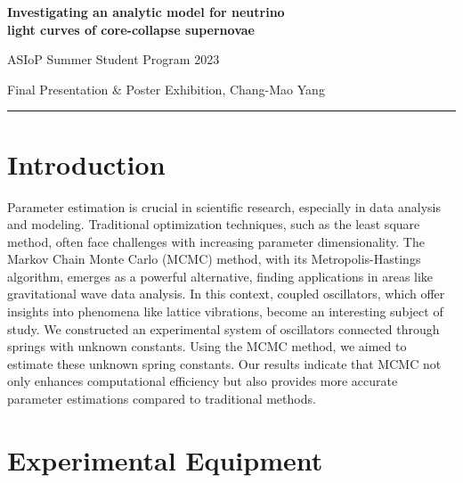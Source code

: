 \documentclass[12pt, a4paper]{article}%
\begin{document}
\begin{center}
{\Large\bf Investigating an analytic model for neutrino\\ light curves of core-collapse supernovae}

\vspace{5pt}
{\large ASIoP Summer Student Program 2023}

Final Presentation \& Poster Exhibition, Chang-Mao Yang

\vspace{5pt}
\hrule
\vspace{6pt}

\end{center}
	
\section{Introduction}

Parameter estimation is crucial in scientific research, especially in data analysis and modeling. Traditional optimization techniques, such as the least square method, often face challenges with increasing parameter dimensionality. The Markov Chain Monte Carlo (MCMC) method, with its Metropolis-Hastings algorithm, emerges as a powerful alternative, finding applications in areas like gravitational wave data analysis.
In this context, coupled oscillators, which offer insights into phenomena like lattice vibrations, become an interesting subject of study. We constructed an experimental system of oscillators connected through springs with unknown constants. Using the MCMC method, we aimed to estimate these unknown spring constants. Our results indicate that MCMC not only enhances computational efficiency but also provides more accurate parameter estimations compared to traditional methods.

\section{Experimental Equipment}
\end{document}

